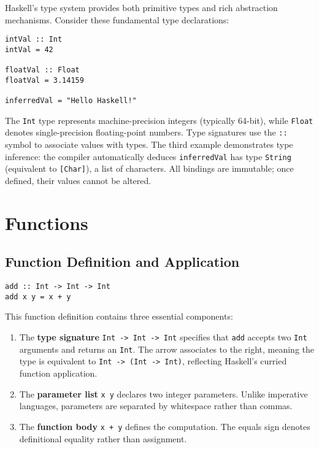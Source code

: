 \documentclass{book}
\begin{document}
Haskell's type system provides both primitive types and rich abstraction mechanisms. Consider these fundamental type declarations:

\begin{lstlisting}
intVal :: Int
intVal = 42

floatVal :: Float 
floatVal = 3.14159

inferredVal = "Hello Haskell!"
\end{lstlisting}

The \texttt{Int} type represents machine-precision integers (typically 64-bit), while \texttt{Float} denotes single-precision floating-point numbers. Type signatures use the \texttt{::} symbol to associate values with types. The third example demonstrates type inference: the compiler automatically deduces \texttt{inferredVal} has type \texttt{String} (equivalent to \texttt{[Char]}), a list of characters. All bindings are immutable; once defined, their values cannot be altered.

\section{Functions}
\label{sec:functions}

\subsection{Function Definition and Application}
\begin{lstlisting}
add :: Int -> Int -> Int
add x y = x + y
\end{lstlisting}

This function definition contains three essential components:
\begin{enumerate}
\item The \textbf{type signature} \texttt{Int -> Int -> Int} specifies that \texttt{add} accepts two \texttt{Int} arguments and returns an \texttt{Int}. The arrow associates to the right, meaning the type is equivalent to \texttt{Int -> (Int -> Int)}, reflecting Haskell's curried function application.

\item The \textbf{parameter list} \texttt{x y} declares two integer parameters. Unlike imperative languages, parameters are separated by whitespace rather than commas.

\item The \textbf{function body} \texttt{x + y} defines the computation. The equals sign denotes definitional equality rather than assignment.
\end{enumerate}
\end{document}
